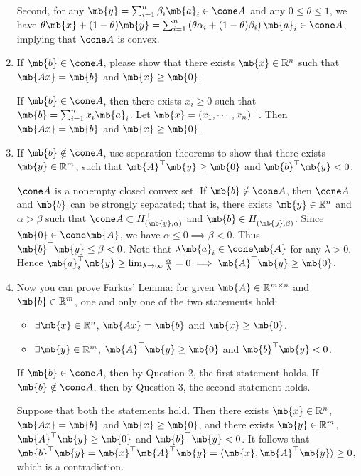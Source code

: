 \begin{exercise}
\begin{enumerate}
\begin{solution}
        Second, for any $\mb{y} = \sum_{i=1}^n\beta_i\mb{a}_i\in \cone A$ and any $0\le\theta\le1$, we have $\theta \mb{x} + (1-\theta)\mb{y} = \sum_{i=1}^n\left(\theta\alpha_i + (1-\theta)\beta_i\right)\mb{a}_i\in \cone A$, implying that $\cone A$ is convex.
      \end{solution}
    \item
      If $\mb{b}\in\cone A$, please show that there exists $\mb{x}\in\mathbb{R}^n$ such that $\mb{Ax}=\mb{b}$ and $\mb{x}\ge \mb{0}$.
      \begin{solution}
        If $\mb{b}\in\cone A$, then there exists $x_i\ge 0$ such that $\mb{b}=\sum_{i=1}^n x_i\mb{a}_i$. Let $\mb{x}=(x_1,\cdots, x_n)^\top$. Then $\mb{Ax}=\mb{b}$ and $\mb{x}\ge \mb{0}$.
      \end{solution}
    \item
      If $\mb{b}\notin\cone A$, use separation theorems to show that there exists $\mb{y}\in\mathbb{R}^m$, such that $\mb{A}^\top \mb{y}\ge \mb{0}$ and $\mb{b}^\top\mb{y}<0$.
      \begin{solution}
        $\cone A$ is a nonempty closed convex set. If $\mb{b} \notin \cone A$, then $\cone A$ and $\mb{b}$ can be strongly separated; that is, there exists $\mb{y}\in \mathbb{R}^n$ and $\alpha>\beta$ such that $\cone A \subset H^+_{(\mb{y},\alpha)}$ and $\mb{b} \in H^-_{(\mb{y},\beta)}$. Since $\mb{0}\in \cone \mb{A}$, we have $\alpha \le 0 \implies \beta < 0$. Thus $\mb{b}^\top \mb{y} \le \beta < 0$. Note that $\lambda\mb{a}_i \in \cone \mb{A}$ for any $\lambda >0$. Hence $\mb{a}_i^\top \mb{y}\ge \lim_{\lambda\to\infty} \frac{\alpha}{\lambda} = 0 \implies \mb{A}^\top \mb{y}\ge \mb{0}$.
      \end{solution}
    \item
      Now you can prove Farkas' Lemma: for given $\mb{A}\in\mathbb{R}^{m\times n}$ and $\mb{b}\in\mathbb{R}^m$, one and only one of the two statements hold:
      \begin{itemize}
        \item
          $\exists \mb{x}\in\mathbb{R}^n$, $\mb{Ax}=\mb{b}$ and $\mb{x}\ge \mb{0}$.
        \item
          $\exists \mb{y}\in\mathbb{R}^m$, $\mb{A}^\top\mb{y}\ge\mb{0}$ and $\mb{b}^\top\mb{y}<0$.
      \end{itemize}
      \begin{solution}
        If $\mb{b}\in\cone A$, then by Question 2, the first statement holds. If $\mb{b}\notin\cone A$, then by Question 3, the second statement holds.

        Suppose that both the statements hold. Then there exists $\mb{x}\in\mathbb{R}^n$, $\mb{Ax}=\mb{b}$ and $\mb{x}\ge \mb{0}$, and there exists $\mb{y}\in\mathbb{R}^m$, $\mb{A}^\top\mb{y}\ge\mb{0}$ and $\mb{b}^\top\mb{y}<0$. It follows that $\mb{b}^\top \mb{y} = \mb{x}^\top \mb{A}^\top \mb{y} = \langle \mb{x}, \mb{A}^\top \mb{y} \rangle \ge 0$, which is a contradiction.
      \end{solution}
  \end{enumerate}
\end{exercise}
\newpage


